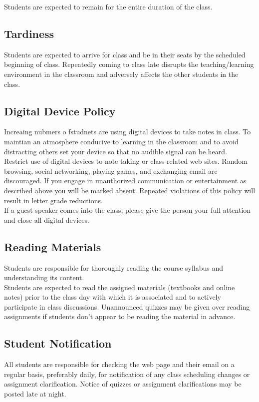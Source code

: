 \documentclass[a4paper,11pt,twocolumn]{article}
\begin{document}
\noindent Students are expected to remain for the entire duration of the class.

\subsection*{Tardiness}
Students are expected to arrive for class and be in their seats by the scheduled beginning of class. Repeatedly coming to class late disrupts the teaching/learning environment in the classroom and adversely affects the other students in the class.

\subsection*{Digital Device Policy}
Increaing nubmers o fstudnets are using digital devices to take notes in class. To maintian an atmosphere conducive to learning in the classroom and to avoid distracting others set your device so that no audible signal can be heard.\\

\noindent Restrict use of digital devices to note taking or class-related web sites. Random browsing, social networking, playing games, and exchanging email are discouraged. If you engage in unauthorized communication or entertainment as described above you will be marked absent. Repeated violations of this policy will result in letter grade reductions.\\

\noindent If a guest speaker comes into the class, please give the person your full attention and close all digital devices.

\subsection*{Reading Materials}
Students are responsible for thoroughly reading the course syllabus and understanding its content.\\

\noindent Students are expected to read the assigned materials (textbooks and online notes) prior to the class day with which it is associated and to actively participate in class discussions. Unannounced quizzes may be given over reading assignments if students don't appear to be reading the material in advance.

\subsection*{Student Notification}
All students are responsible for checking the web page and their email on a regular basis, preferably daily, for notification of any class scheduling changes or assignment clarification. Notice of quizzes or assignment clarifications may be posted late at night.
\end{document}
